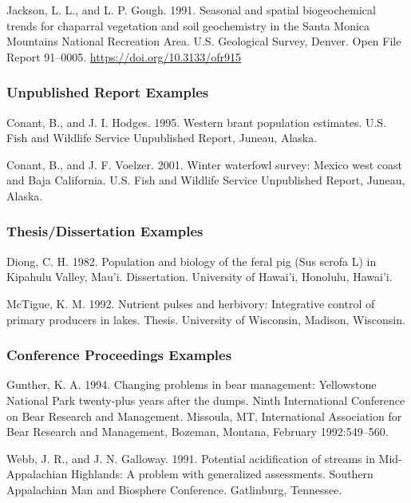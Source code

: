 \documentclass[
]{article}
\begin{document}
Jackson, L. L., and L. P. Gough. 1991. Seasonal and spatial
biogeochemical trends for chaparral vegetation and soil geochemistry in
the Santa Monica Mountains National Recreation Area. U.S. Geological
Survey, Denver. Open File Report 91--0005.
\url{https://doi.org/10.3133/ofr915}

\hypertarget{unpublished-report-examples}{%
\subsubsection{Unpublished Report
Examples}\label{unpublished-report-examples}}

Conant, B., and J. I. Hodges. 1995. Western brant population estimates.
U.S. Fish and Wildlife Service Unpublished Report, Juneau, Alaska.

Conant, B., and J. F. Voelzer. 2001. Winter waterfowl survey: Mexico
west coast and Baja California. U.S. Fish and Wildlife Service
Unpublished Report, Juneau, Alaska.

\hypertarget{thesisdissertation-examples}{%
\subsubsection{Thesis/Dissertation
Examples}\label{thesisdissertation-examples}}

Diong, C. H. 1982. Population and biology of the feral pig (Sus scrofa
L) in Kipahulu Valley, Mau'i. Dissertation. University of Hawai'i,
Honolulu, Hawai'i.

McTigue, K. M. 1992. Nutrient pulses and herbivory: Integrative control
of primary producers in lakes. Thesis. University of Wisconsin, Madison,
Wisconsin.

\hypertarget{conference-proceedings-examples}{%
\subsubsection{Conference Proceedings
Examples}\label{conference-proceedings-examples}}

Gunther, K. A. 1994. Changing problems in bear management: Yellowstone
National Park twenty-plus years after the dumps. Ninth International
Conference on Bear Research and Management. Missoula, MT, International
Association for Bear Research and Management, Bozeman, Montana, February
1992:549--560.

Webb, J. R., and J. N. Galloway. 1991. Potential acidification of
streams in Mid-Appalachian Highlands: A problem with generalized
assessments. Southern Appalachian Man and Biosphere Conference.
Gatlinburg, Tennessee.
\end{document}
